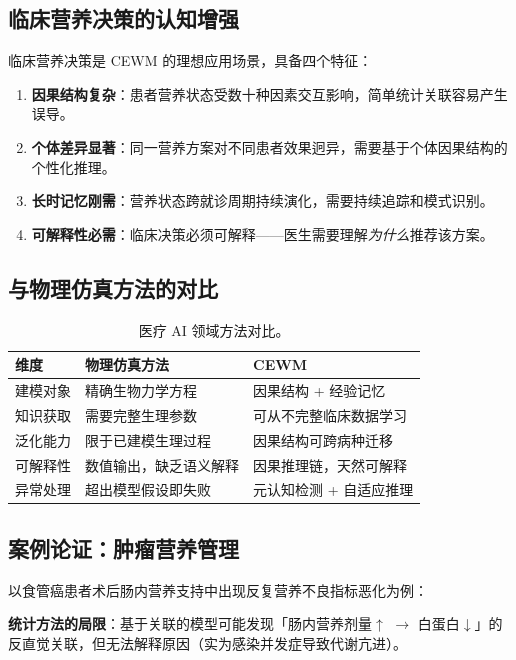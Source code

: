 \documentclass[11pt,a4paper]{article}
\newcommand{\CEWM}{\textsc{CEWM}}
\begin{document}
\subsection{临床营养决策的认知增强}

临床营养决策是 \CEWM{} 的理想应用场景，具备四个特征：
\begin{enumerate}[nosep]
  \item \textbf{因果结构复杂}：患者营养状态受数十种因素交互影响，简单统计关联容易产生误导。
  \item \textbf{个体差异显著}：同一营养方案对不同患者效果迥异，需要基于个体因果结构的个性化推理。
  \item \textbf{长时记忆刚需}：营养状态跨就诊周期持续演化，需要持续追踪和模式识别。
  \item \textbf{可解释性必需}：临床决策必须可解释——医生需要理解\emph{为什么}推荐该方案。
\end{enumerate}

\subsection{与物理仿真方法的对比}

\begin{table}[H]
\centering
\caption{医疗 AI 领域方法对比。}\label{tab:medical-compare}
\small
\begin{tabularx}{\textwidth}{lXX}
\toprule
\textbf{维度} & \textbf{物理仿真方法} & \textbf{\CEWM{}} \\
\midrule
建模对象 & 精确生物力学方程 & 因果结构 + 经验记忆 \\
知识获取 & 需要完整生理参数 & 可从不完整临床数据学习 \\
泛化能力 & 限于已建模生理过程 & 因果结构可跨病种迁移 \\
可解释性 & 数值输出，缺乏语义解释 & 因果推理链，天然可解释 \\
异常处理 & 超出模型假设即失败 & 元认知检测 + 自适应推理 \\
\bottomrule
\end{tabularx}
\end{table}

\subsection{案例论证：肿瘤营养管理}

以食管癌患者术后肠内营养支持中出现反复营养不良指标恶化为例：

\textbf{统计方法的局限}：基于关联的模型可能发现「肠内营养剂量$\uparrow$ $\to$ 白蛋白$\downarrow$」的反直觉关联，但无法解释原因（实为感染并发症导致代谢亢进）。
\end{document}
